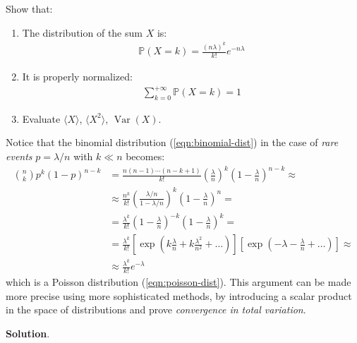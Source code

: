 \documentclass[../template.tex]{subfiles}
\begin{document}
\begin{exo}
\begin{enumerate}[label=\alph*.]
        Show that:
        \begin{enumerate}[label=\roman*.]
            \item The distribution of the sum $X$ is:
            \begin{align*}
                \mathbb{P}(X=k) = \frac{(n \lambda)^k}{k!} e^{-n \lambda} 
            \end{align*}
            \item It is properly normalized:
            \begin{align*}
                \sum_{k=0}^{+\infty} \mathbb{P}(X=k) = 1
            \end{align*}
            \item Evaluate $\langle X \rangle$, $\langle X^2 \rangle$, $\operatorname{Var}(X)$. 
        \end{enumerate}
    \end{enumerate}

    Notice that the binomial distribution (\ref{eqn:binomial-dist}) in the case of \textit{rare events} $p=\lambda/n$ with $k \ll n$ becomes:
    \begin{align*}
        {n\choose k} p^k(1-p)^{n-k} &= \frac{n(n-1)\cdots (n-k+1)}{k!} \left(\frac{\lambda}{n} \right)^k \left(1-\frac{\lambda}{n} \right)^{n-k} \approx\\
        &\approx \frac{n^k}{k!} \left(\frac{\lambda/n}{1 - \lambda/n} \right)^k \left(1-\frac{\lambda}{n} \right)^n =\\
        &= \frac{\lambda^k}{k!}\left(1-\frac{\lambda}{n} \right)^{-k} \left(1-\frac{\lambda}{n} \right)^k =\\
        &=\frac{\lambda^k}{k!}\left[\exp\left(k \frac{\lambda}{n}+k \frac{\lambda^2}{n^2} + \dots \right) \right] \left[\exp\left(-\lambda -\frac{\lambda}{n} + \dots \right)\right] \approx\\
        &\approx \frac{\lambda^k}{k!} e^{-\lambda} 
    \end{align*} 
    which is a Poisson distribution (\ref{eqn:poisson-dist}). This argument can be made more precise using more sophisticated methods, by introducing a scalar product in the space of distributions and prove \textit{convergence in total variation}.
    
    \medskip

    \textbf{Solution}. 
    

\end{exo}
\end{document}
